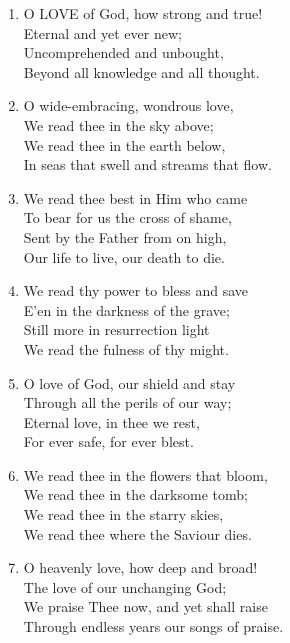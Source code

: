\documentclass[11pt,a4paper]{article}
\begin{document}
\begin{enumerate}
    \item O LOVE of God, how strong and true! \\
        Eternal and yet ever new; \\
        Uncomprehended and unbought, \\
        Beyond all knowledge and all thought.

    \item O wide-embracing, wondrous love, \\
        We read thee in the sky above; \\
        We read thee in the earth below, \\
        In seas that swell and streams that flow.

    \item We read thee best in Him who came \\
        To bear for us the cross of shame, \\
        Sent by the Father from on high, \\
        Our life to live, our death to die.

    \item We read thy power to bless and save \\
        E'en in the darkness of the grave; \\
        Still more in resurrection light \\
        We read the fulness of thy might.

    \item O love of God, our shield and stay \\
        Through all the perils of our way; \\
        Eternal love, in thee we rest, \\
        For ever safe, for ever blest.

    \item We read thee in the flowers that bloom, \\
        We read thee in the darksome tomb; \\
        We read thee in the starry skies, \\
        We read thee where the Saviour dies.

    \item O heavenly love, how deep and broad! \\
        The love of our unchanging God; \\
        We praise Thee now, and yet shall raise \\
        Through endless years our songs of praise.

\end{enumerate}
\end{document}
